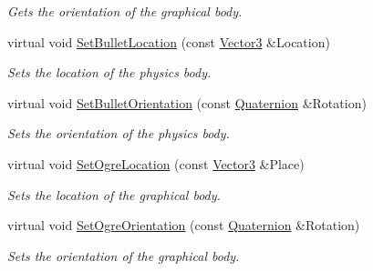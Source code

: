 \begin{DoxyCompactItemize}
\begin{DoxyCompactList}\small\item\em Gets the orientation of the graphical body. \item\end{DoxyCompactList}\item 
virtual void \hyperlink{classMezzanine_1_1ActorBase_a8f7018838c67f07cd554730ac83f4283}{SetBulletLocation} (const \hyperlink{classMezzanine_1_1Vector3}{Vector3} \&Location)
\begin{DoxyCompactList}\small\item\em Sets the location of the physics body. \item\end{DoxyCompactList}\item 
virtual void \hyperlink{classMezzanine_1_1ActorBase_a088bc9b26f4747e6f2896591a0f7b190}{SetBulletOrientation} (const \hyperlink{classMezzanine_1_1Quaternion}{Quaternion} \&Rotation)
\begin{DoxyCompactList}\small\item\em Sets the orientation of the physics body. \item\end{DoxyCompactList}\item 
virtual void \hyperlink{classMezzanine_1_1ActorBase_a4b2a3281be30dcc983b514ecaff14a51}{SetOgreLocation} (const \hyperlink{classMezzanine_1_1Vector3}{Vector3} \&Place)
\begin{DoxyCompactList}\small\item\em Sets the location of the graphical body. \item\end{DoxyCompactList}\item 
virtual void \hyperlink{classMezzanine_1_1ActorBase_a5958552c8b356775b5447c0bd6448102}{SetOgreOrientation} (const \hyperlink{classMezzanine_1_1Quaternion}{Quaternion} \&Rotation)
\begin{DoxyCompactList}\small\item\em Sets the orientation of the graphical body. \item\end{DoxyCompactList}\end{DoxyCompactItemize}
